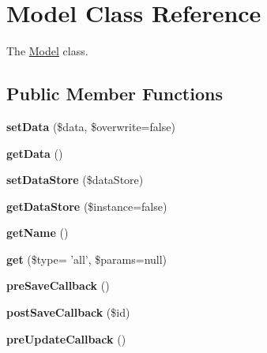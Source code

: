 \hypertarget{class_model}{
\section{Model Class Reference}
\label{class_model}
}


The \hyperlink{class_model}{Model} class.  


\subsection*{Public Member Functions}
\begin{DoxyCompactItemize}
\item 
\hypertarget{class_model_a32babb4a5f469131646220602d9f4be1}{
{\bfseries setData} (\$data, \$overwrite=false)}
\label{class_model_a32babb4a5f469131646220602d9f4be1}

\item 
\hypertarget{class_model_a199ab018d51923c00e8410c96d4b3c07}{
{\bfseries getData} ()}
\label{class_model_a199ab018d51923c00e8410c96d4b3c07}

\item 
\hypertarget{class_model_a9285dc5e540f28fedebb5b944df61251}{
{\bfseries setDataStore} (\$dataStore)}
\label{class_model_a9285dc5e540f28fedebb5b944df61251}

\item 
\hypertarget{class_model_a642b3db02ada9fda1b1803715f919219}{
{\bfseries getDataStore} (\$instance=false)}
\label{class_model_a642b3db02ada9fda1b1803715f919219}

\item 
\hypertarget{class_model_a99ae6ab8071fc0d1e62894ce22edf5ad}{
{\bfseries getName} ()}
\label{class_model_a99ae6ab8071fc0d1e62894ce22edf5ad}

\item 
\hypertarget{class_model_aad1e76218788445160f785065c0b3e7f}{
{\bfseries get} (\$type= 'all', \$params=null)}
\label{class_model_aad1e76218788445160f785065c0b3e7f}

\item 
\hypertarget{class_model_aea1e1a8ec67cc2fd3e37c8796d383f00}{
{\bfseries preSaveCallback} ()}
\label{class_model_aea1e1a8ec67cc2fd3e37c8796d383f00}

\item 
\hypertarget{class_model_a9e4c9eab28fd2639a7400444b66abf9c}{
{\bfseries postSaveCallback} (\$id)}
\label{class_model_a9e4c9eab28fd2639a7400444b66abf9c}

\item 
\hypertarget{class_model_a691e3fcfd578473894897fc016a7b982}{
{\bfseries preUpdateCallback} ()}
\label{class_model_a691e3fcfd578473894897fc016a7b982}


\end{DoxyCompactItemize}
